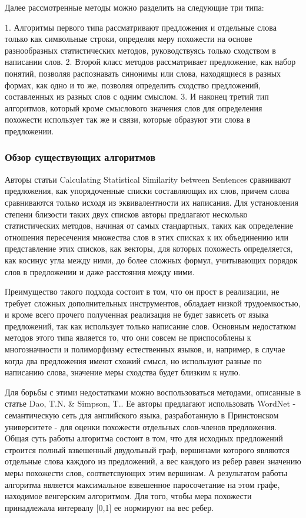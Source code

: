 Далее рассмотренные методы можно разделить на следующие три типа:

1. Алгоритмы первого типа\cite{statisticalSim} рассматривают предложения и отдельные слова только как символьные строки, 
определяя меру похожести на основе разнообразных статистических методов, руководствуясь только сходством в написании слов.
2. Второй класс методов\cite{wordnetSim} рассматривает предложение, как набор понятий, позволяя распознавать синонимы 
или слова, находящиеся в разных формах, как одно и то же, позволяя определить сходство предложений, 
составленных из разных слов с одним смыслом.
3. И наконец третий тип алгоритмов\cite{weightedDep}\cite{complexSim}, который кроме смыслового значения слов для определения похожести
использует так же и связи, которые образуют эти слова в предложении.

\subsubsection{Обзор существующих алгоритмов}

Авторы статьи Calculating Statistical Similarity between Sentences\cite{statisticalSim} сравнивают предложения, 
как упорядоченные списки составляющих их слов, причем слова сравниваются только исходя из эквивалентности их написания. 
Для установления степени близости таких двух списков авторы предлагают несколько статистических методов,
начиная от самых стандартных, таких как определение отношения пересечения множества слов в этих списках к их объединению
или представление этих списков, как векторы, для которых похожесть определяется, как косинус угла между ними,
до более сложных формул, учитывающих порядок слов в предложении и даже расстояния между ними.

Преимущество такого подхода состоит в том, что он прост в реализации, не требует
сложных дополнительных инструментов, обладает низкой трудоемкостью, и кроме всего
прочего полученная реализация не будет зависеть от языка предложений, 
так как использует только написание слов.
Основным недостатком методов этого типа является то, что они совсем
не приспособлены к многозначности и полиморфизму естественных языков, и,
например, в случае когда два предложения имеют схожий смысл, но используют разные по написанию слова,
значение меры сходства будет близким к нулю.

Для борьбы с этими недостатками можно воспользоваться методами, описанные в статье Dao, T.N. & Simpson, T.\cite{wordnetSim}.
Ее авторы предлагают использовать WordNet\cite{wordnet} - семантическую сеть для английского языка, 
разработанную в Принстонском университете - для оценки похожести отдельных слов-членов предложения.
Общая суть работы алгоритма состоит в том, что для исходных предложений
строится полный взвешенный двудольный граф, вершинами которого являются отдельные
слова каждого из предложений, а вес каждого из ребер равен значению меры похожести слов,
соответсвующих этим вершинам. А результатом работы алгоритма является максимальное
взвешенное паросочетание на этом графе, находимое венгерским алгоритмом.
Для того, чтобы мера похожести принадлежала интервалу [0,1] ее нормируют на вес ребер.

